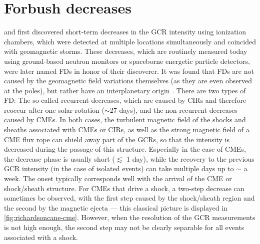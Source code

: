 \section{Forbush decreases}
\label{sec:forbush}

\citet{Forbush-1937} and \citet{Hess-1937} first discovered short-term decreases in the \ac{GCR} intensity using ionization chambers, which were detected at multiple locations simultaneously and coincided with geomagnetic storms. These decreases, which are routinely measured today using ground-based neutron monitors or spaceborne energetic particle detectors, were later named \acp{FD} in honor of their discoverer. It was found that \acp{FD} are not caused by the geomagnetic field variations themselves (as they are even observed at the poles), but rather have an interplanetary origin \citep[see e.g.][and references therein]{Lockwood1971}. There are two types of \ac{FD}: The so-called recurrent decreases, which are caused by \acp{CIR} and therefore reoccur after one solar rotation ($\sim$27 days), and the non-recurrent decreases caused by \acp{CME}. In both cases, the turbulent magnetic field of the shocks and sheaths associated with \acp{CME} or \acp{CIR}, as well as the strong magnetic field of a \ac{CME} flux rope can shield away part of the \acp{GCR}, so that the intensity is decreased during the passage of this structure.
Especially in the case of \acp{CME}, the decrease phase is usually short ($\lesssim$ 1 day), while the recovery to the previous \ac{GCR} intensity (in the case of isolated events) can take multiple days up to $\sim$ a week. The onset typically corresponds well with the arrival of the \ac{CME} or shock/sheath structure. For \acp{CME} that drive a shock, a two-step decrease can sometimes be observed, with the first step caused by the shock/sheath region and the second by the magnetic ejecta --- this classical picture is displayed in \autoref{fig:richardsoncane-cme}. However, when the resolution of the \ac{GCR} measurements is not high enough, the second step may not be clearly separable for all events associated with a shock.
